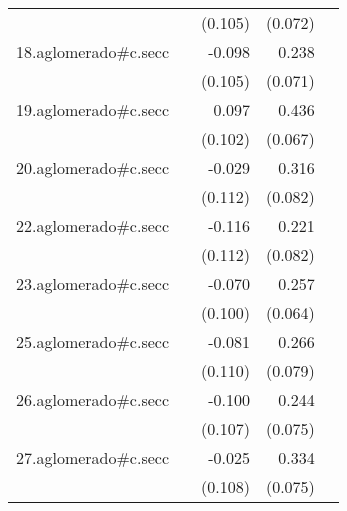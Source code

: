 {\begin{longtable}{l*{4}{D{.}{.}{-1}}}
            &                     &     (0.105)         &     (0.072)         &                     \\
\addlinespace
18.aglomerado#c.secc&                     &      -0.098         &       0.238\sym{***}&                     \\
            &                     &     (0.105)         &     (0.071)         &                     \\
\addlinespace
19.aglomerado#c.secc&                     &       0.097         &       0.436\sym{***}&                     \\
            &                     &     (0.102)         &     (0.067)         &                     \\
\addlinespace
20.aglomerado#c.secc&                     &      -0.029         &       0.316\sym{***}&                     \\
            &                     &     (0.112)         &     (0.082)         &                     \\
\addlinespace
22.aglomerado#c.secc&                     &      -0.116         &       0.221\sym{**} &                     \\
            &                     &     (0.112)         &     (0.082)         &                     \\
\addlinespace
23.aglomerado#c.secc&                     &      -0.070         &       0.257\sym{***}&                     \\
            &                     &     (0.100)         &     (0.064)         &                     \\
\addlinespace
25.aglomerado#c.secc&                     &      -0.081         &       0.266\sym{***}&                     \\
            &                     &     (0.110)         &     (0.079)         &                     \\
\addlinespace
26.aglomerado#c.secc&                     &      -0.100         &       0.244\sym{**} &                     \\
            &                     &     (0.107)         &     (0.075)         &                     \\
\addlinespace
27.aglomerado#c.secc&                     &      -0.025         &       0.334\sym{***}&                     \\
            &                     &     (0.108)         &     (0.075)         &                     \\

\end{longtable}}
